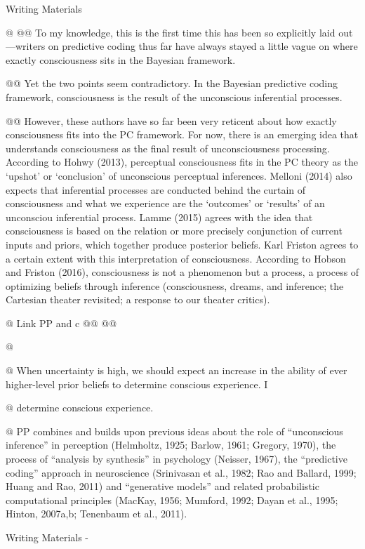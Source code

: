 \documentclass[utf8]{article}
\newenvironment{WritingMaterials} %
    	{
            \begin{tcolorbox}[enhanced,
                title=-,
                size=small,
                colbacktitle=Aquamarine,
                drop fuzzy shadow,
                fontupper=\small,
                boxrule=0.4pt,
                colback=Aquamarine!10!white,
                sharp corners]
                Writing Materials
            \end{tcolorbox}
            \begin{easylist}[itemize]
    	}
    	{
            \end{easylist}  
            \begin{tcolorbox}[enhanced,
                halign=flush right,
                halign title=right,
                size=small,
                colbacktitle=Aquamarine,
                drop fuzzy shadow,
                fontupper=\small,
                boxrule=0.4pt,
                colback=Aquamarine,
                colupper=White,
                sharp corners]
                Writing Materials -
            \end{tcolorbox}        
    	}
\begin{document}
			\begin{WritingMaterials}

				@ \cite{lamme2015predictive}
					@@ To my knowledge, this is the first time this has been so explicitly laid out—writers on predictive coding thus far have always stayed a little vague on where exactly consciousness sits in the Bayesian framework.

					@@ Yet the two points seem contradictory. In the Bayesian predictive coding framework, consciousness is the result of the unconscious inferential processes.


					@@ However, these authors have so far been very reticent about how exactly consciousness fits into the PC framework. For now, there is an emerging idea that understands consciousness as the final result of unconsciousness processing. According to Hohwy (2013), perceptual consciousness fits in the PC theory as the ‘upshot’ or ‘conclusion’ of unconscious perceptual inferences. Melloni (2014) also expects that inferential processes are conducted behind the curtain of consciousness and what we experience are the ‘outcomes’ or ‘results’ of an unconsciou inferential process. Lamme (2015) agrees with the idea that consciousness is based on the relation or more precisely conjunction of current inputs and priors, which together produce posterior beliefs. Karl Friston agrees to a certain extent with this interpretation of consciousness. According to Hobson and Friston (2016), consciousness is not a phenomenon but a process, a process of optimizing beliefs through inference (consciousness, dreams, and inference; the Cartesian theater revisited; a response to our theater critics).


				@ Link PP and c
					@@ \cite{hobson2016response}
					@@ \cite{Melloni2015}

				@ \cite{SethPP2014}

				@ When uncertainty is high, we should expect an increase in the ability of ever higher-level prior beliefs to determine conscious experience. I

				@ determine conscious experience.

				@ PP combines and builds upon previous ideas about the role of “unconscious inference” in perception (Helmholtz, 1925; Barlow, 1961; Gregory, 1970), the process of “analysis by synthesis” in psychology (Neisser, 1967), the “predictive coding” approach in neuroscience (Srinivasan et al., 1982; Rao and Ballard, 1999; Huang and Rao, 2011) and “generative models” and related probabilistic computational principles (MacKay, 1956; Mumford, 1992; Dayan et al., 1995; Hinton, 2007a,b; Tenenbaum et al., 2011).



\end{WritingMaterials}
\end{document}
